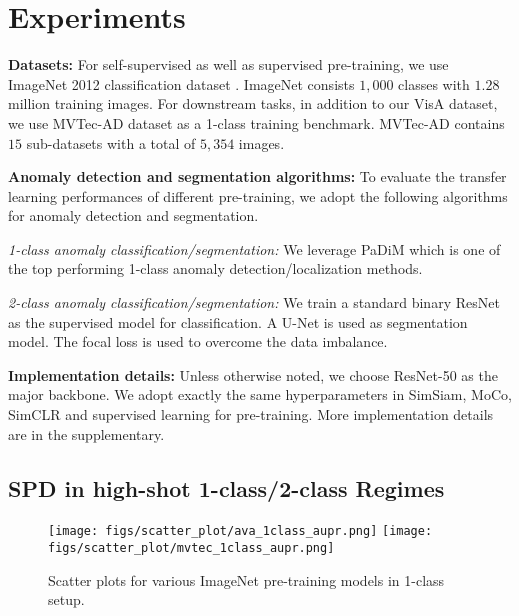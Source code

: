 \documentclass[runningheads]{llncs}
\begin{document}
\section{Experiments}\label{sec:exp}

\noindent\textbf{Datasets:} For self-supervised as well as supervised pre-training, we use ImageNet 2012 classification dataset \cite{deng2009imagenet}. ImageNet consists $1,000$ classes with $1.28$ million training images. For downstream tasks, in addition to our VisA dataset, we use MVTec-AD dataset \cite{bergmann2019mvtec} as a 1-class training benchmark. MVTec-AD contains $15$ sub-datasets with a total of $5,354$ images.

\noindent\textbf{Anomaly detection and segmentation algorithms:} To evaluate the transfer learning performances of different pre-training, we adopt the following algorithms for anomaly detection and segmentation. 

\noindent\emph{1-class anomaly classification/segmentation:} We leverage PaDiM \cite{defard2021padim} which is one of the top performing 1-class anomaly detection/localization methods. 

\noindent\emph{2-class anomaly classification/segmentation:} We train a standard binary ResNet \cite{he2016deep} as the supervised model for classification. A U-Net \cite{ronneberger2015u} is used as segmentation model. The focal loss \cite{lin2017focal} is used to overcome the data imbalance. 

\noindent\textbf{Implementation details:} Unless otherwise noted, we choose ResNet-50 as the major backbone. We adopt exactly the same hyperparameters in SimSiam, MoCo, SimCLR and supervised learning for pre-training. More implementation details are in the supplementary.

\subsection{SPD in high-shot 1-class/2-class Regimes}
\begin{figure}[!t]
\centering
\texttt{[image: figs/scatter\_plot/ava\_1class\_aupr.png]}
\texttt{[image: figs/scatter\_plot/mvtec\_1class\_aupr.png]}\\
 \caption{Scatter plots for various ImageNet pre-training models in 1-class setup.}
 \label{fig:scatter}
\end{figure}
\end{document}
